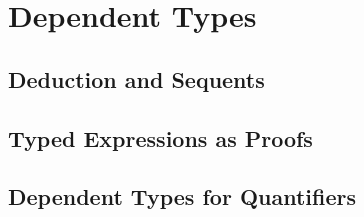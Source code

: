 % 
\chapter{Dependent Types}
\section{Deduction and Sequents}
\section{Typed Expressions as Proofs}
\section{Dependent Types for Quantifiers}
% 
